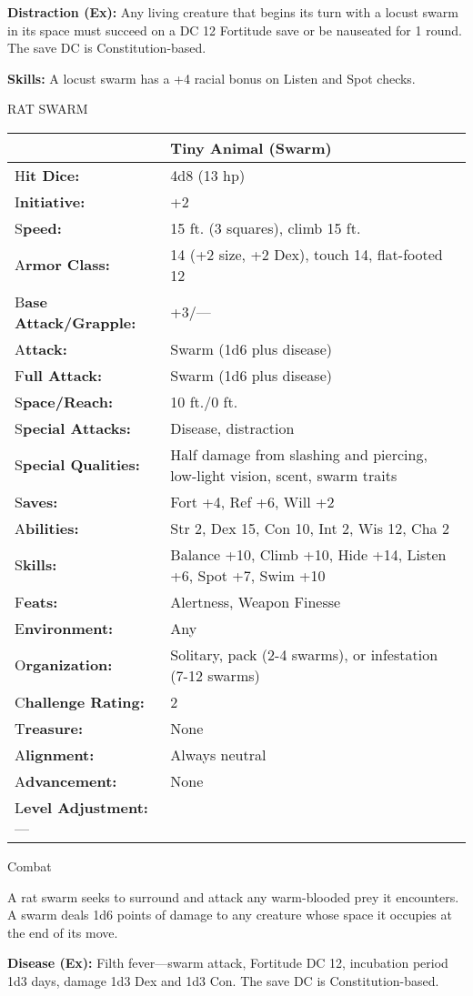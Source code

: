 \documentclass{article}
\begin{document}
\textbf{Distraction (Ex): }Any living creature that begins its turn with a locust 
swarm in its space must succeed on a DC 12 Fortitude save or be nauseated for 1 
round. The save DC is Constitution-based.

\textbf{Skills:} A locust swarm has a +4 racial bonus on Listen and Spot checks.

\vspace{12pt}
RAT SWARM

\begin{tabular}{|>{\raggedright}p{91pt}|>{\raggedright}p{204pt}|}
\hline
  & Tiny Animal (Swarm)\tabularnewline
\hline
H\textbf{it Dice:} & 4d8 (13 hp)\tabularnewline
\hline
I\textbf{nitiative:} & +2\tabularnewline
\hline
S\textbf{peed:} & 15 ft. (3 squares), climb 15 ft.\tabularnewline
\hline
A\textbf{rmor Class:} & 14 (+2 size, +2 Dex), touch 14, flat-footed 12\tabularnewline
\hline
B\textbf{ase Attack/Grapple:} & +3/---\tabularnewline
\hline
A\textbf{ttack:} & Swarm (1d6 plus disease)\tabularnewline
\hline
F\textbf{ull Attack:} & Swarm (1d6 plus disease)\tabularnewline
\hline
S\textbf{pace/Reach:} & 10 ft./0 ft.\tabularnewline
\hline
S\textbf{pecial Attacks:} & Disease, distraction\tabularnewline
\hline
S\textbf{pecial Qualities:} & Half damage from slashing and piercing, low-light 
vision, scent, swarm traits\tabularnewline
\hline
S\textbf{aves:} & Fort +4, Ref +6, Will +2\tabularnewline
\hline
A\textbf{bilities:} & Str 2, Dex 15, Con 10, Int 2, Wis 12, Cha 2\tabularnewline
\hline
S\textbf{kills:} & Balance +10, Climb +10, Hide +14, Listen +6, Spot +7, Swim +10\tabularnewline
\hline
F\textbf{eats:} & Alertness, Weapon Finesse\tabularnewline
\hline
E\textbf{nvironment:} & Any\tabularnewline
\hline
O\textbf{rganization:} & Solitary, pack (2-4 swarms), or infestation (7-12 swarms)\tabularnewline
\hline
C\textbf{hallenge Rating:} & 2\tabularnewline
\hline
T\textbf{reasure:} & None\tabularnewline
\hline
A\textbf{lignment:} & Always neutral\tabularnewline
\hline
A\textbf{dvancement:} & None\tabularnewline
\hline
L\textbf{evel Adjustment:}--- & \tabularnewline
\hline
\end{tabular}

Combat

A rat swarm seeks to surround and attack any warm-blooded prey it encounters. A 
swarm deals 1d6 points of damage to any creature whose space it occupies at the 
end of its move.

\textbf{Disease (Ex):} Filth fever---swarm attack, Fortitude DC 12, incubation 
period 1d3 days, damage 1d3 Dex and 1d3 Con. The save DC is Constitution-based.
\end{document}
